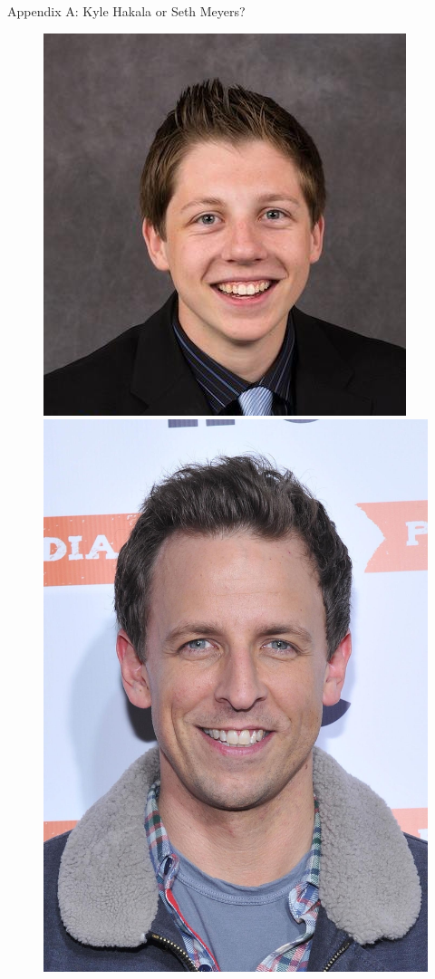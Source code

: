 \documentclass[xcolor=dvipsnames,aspectratio=1610]{beamer}
\begin{document}
\begin{frame}{Appendix A: Kyle Hakala or Seth Meyers?}
      \begin{figure}
      \centering
      \begin{minipage}{.5\textwidth}
        \centering
        \includegraphics[width=\linewidth]{kyle.png}
      \end{minipage}%
      \begin{minipage}{.5\textwidth}
        \centering
        \includegraphics[width=.8\linewidth]{seth.jpg}
      \end{minipage}
      \end{figure}


\end{frame}
\end{document}
